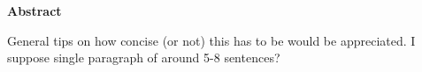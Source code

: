 \mbox{}\newline\vspace{10mm} \mbox{}\LARGE
{\bf Abstract} \normalsize \vspace{5mm}

    General tips on how concise (or not) this has to be would be appreciated. I suppose single paragraph of around 5-8 sentences?